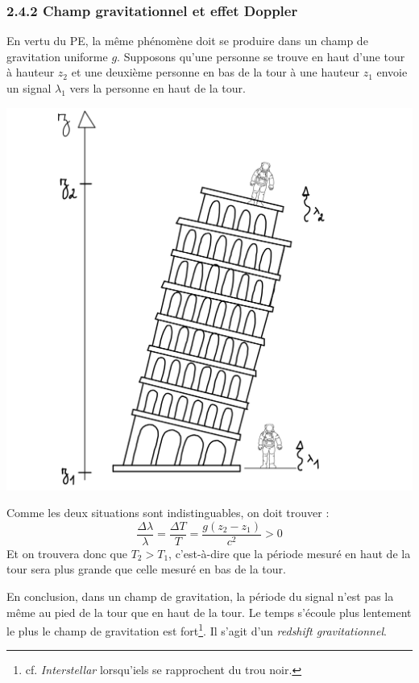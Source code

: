 \subsubsection{2.4.2 Champ gravitationnel et effet Doppler}
En vertu du PE, la même phénomène doit se produire dans un champ de gravitation uniforme $g$. Supposons qu'une personne se trouve en haut d'une tour à hauteur $z_2$ et une deuxième personne en bas de la tour à une hauteur $z_1$ envoie un signal $\lambda_1$ vers la personne en haut de la tour. 

\begin{center}
\includegraphics[scale=0.3]{Chapitres/1. Introduction/Images/Tour.png}
\end{center}
Comme les deux situations sont indistinguables, on doit trouver :
\begin{equation}
    \frac{\Delta \lambda}{\lambda} = \frac{\Delta T}{T} = \frac{g(z_2 - z_1)}{c^2}>0
\end{equation}
Et on trouvera donc que $T_2 > T_1$, c'est-à-dire que la période mesuré en haut de la tour sera plus grande que celle mesuré en bas de la tour. 

En conclusion, dans un champ de gravitation, la période du signal n'est pas la même au pied de la tour que en haut de la tour. Le temps s'écoule plus lentement le plus le champ de gravitation est fort\footnote{cf. \emph{Interstellar} lorsqu'iels se rapprochent du trou noir.}. Il s'agit d'un \textit{redshift gravitationnel}. 

